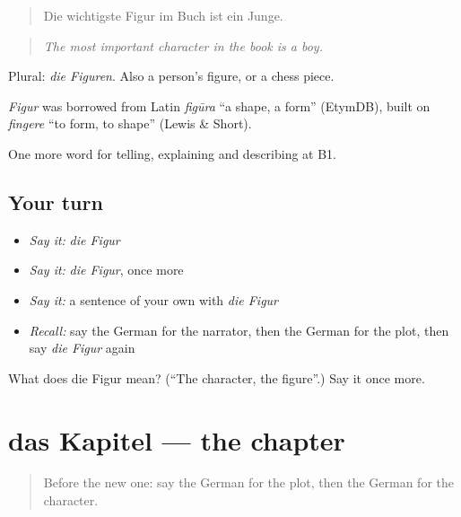 \begin{quote}
Die wichtigste Figur im Buch ist ein Junge.
\end{quote}

\begin{quote}
\emph{The most important character in the book is a boy.}
\end{quote}

Plural: \emph{die Figuren}. Also a person's figure, or a chess piece.

\begin{cousinweb}
\emph{Figur} was borrowed from Latin \emph{figūra} \textquotedblleft{}a shape, a form\textquotedblright{} (EtymDB), built on \emph{fingere} \textquotedblleft{}to form, to shape\textquotedblright{} (Lewis \& Short).
\end{cousinweb}

\begin{grammarlens}[title={What you've built}]
One more word for telling, explaining and describing at B1.
\end{grammarlens}

\subsection*{Your turn}
\begin{itemize}
\raggedright
  \item \emph{Say it:} \emph{die Figur}
  \item \emph{Say it:} \emph{die Figur}, once more
  \item \emph{Say it:} a sentence of your own with \emph{die Figur}
  \item \emph{Recall:} say the German for the narrator, then the German for the plot, then say \emph{die Figur} again
\end{itemize}

\begin{tcolorbox}[breakable,colback=teal!4,colframe=teal!35!black,title={Before you move on}]
What does die Figur mean? (\textquotedblleft{}The character, the figure\textquotedblright{}.) Say it once more.
\end{tcolorbox}
\section[das Kapitel]{das Kapitel — the chapter}

\label{lesson:GE-C316-kapitel}



\begin{quote}
Before the new one: say the German for the plot, then the German for the character.
\end{quote}

